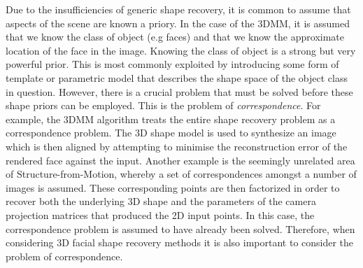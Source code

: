 Due to the insufficiencies of generic shape recovery, it is common to assume
that aspects of the scene are known a priory. In the case of the 3DMM, it is 
assumed that we know the class of object (e.g faces) and that we know the
approximate location of the face in the image. Knowing the class of object is
a strong but very powerful prior. This is most commonly exploited by introducing
some form of template or parametric model that describes the shape space of the
object class in question. However, there is a crucial problem that must be
solved before these shape priors can be employed. This is the problem of
\textit{correspondence}. For example, the 3DMM algorithm treats the entire
shape recovery problem as a correspondence problem. The 3D shape
model is used to synthesize an image which is then aligned by attempting to
minimise the reconstruction error of the rendered face against the input.
Another example is the seemingly unrelated area of Structure-from-Motion,
whereby a set of correspondences amongst a number of images is assumed. These
corresponding points are then factorized in order to recover both the underlying
3D shape and the parameters of the camera projection matrices that produced the
2D input points. In this case, the correspondence problem is assumed to have
already been solved. Therefore, when considering 3D facial shape recovery
methods it is also important to consider the problem of correspondence.
